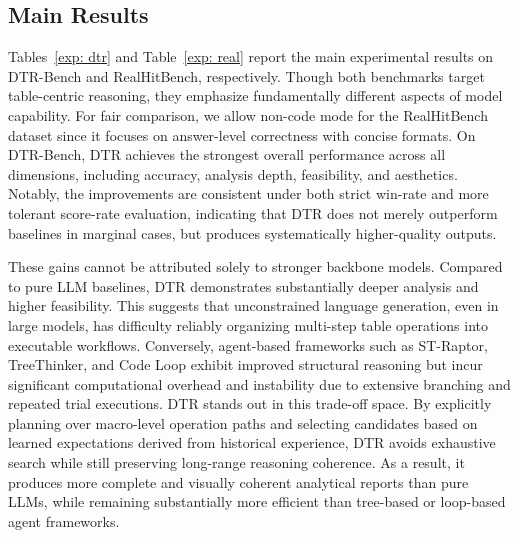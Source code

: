 
\subsection{Main Results}
Tables~\ref{exp: dtr} and Table~\ref{exp: real} report the main experimental results on DTR-Bench and RealHitBench, respectively. Though both benchmarks target table-centric reasoning, they emphasize fundamentally different aspects of model capability. For fair comparison, we allow non-code mode for the RealHitBench dataset since it focuses on answer-level correctness with concise formats. On DTR-Bench, DTR achieves the strongest overall performance across all dimensions, including accuracy, analysis depth, feasibility, and aesthetics. Notably, the improvements are consistent under both strict win-rate and more tolerant score-rate evaluation, indicating that DTR does not merely outperform baselines in marginal cases, but produces systematically higher-quality outputs.

These gains cannot be attributed solely to stronger backbone models. Compared to pure LLM baselines, DTR demonstrates substantially deeper analysis and higher feasibility. This suggests that unconstrained language generation, even in large models, has difficulty reliably organizing multi-step table operations into executable workflows. Conversely, agent-based frameworks such as ST-Raptor, TreeThinker, and Code Loop exhibit improved structural reasoning but incur significant computational overhead and instability due to extensive branching and repeated trial executions. DTR stands out in this trade-off space. By explicitly planning over macro-level operation paths and selecting candidates based on learned expectations derived from historical experience, DTR avoids exhaustive search while still preserving long-range reasoning coherence. As a result, it produces more complete and visually coherent analytical reports than pure LLMs, while remaining substantially more efficient than tree-based or loop-based agent frameworks.

